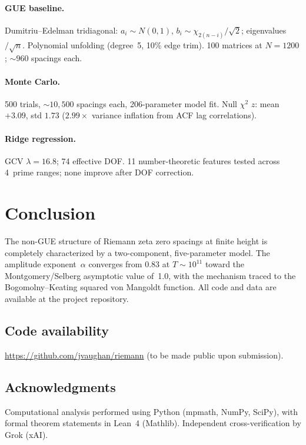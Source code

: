 \documentclass[11pt,a4paper]{article}
\begin{document}
\paragraph{GUE baseline.} Dumitriu--Edelman tridiagonal: $a_i \sim N(0,1)$, $b_i \sim \chi_{2(n-i)}/\!\sqrt{2}$; eigenvalues$/\!\sqrt{n}$.
Polynomial unfolding (degree~5, 10\% edge trim).
100 matrices at $N = 1200$; ${\sim}960$ spacings each.

\paragraph{Monte Carlo.} 500 trials, ${\sim}10{,}500$ spacings each, 206-parameter model fit. Null $\chi^2$ $z$: mean $+3.09$, std $1.73$ ($2.99\times$ variance inflation from ACF lag correlations).

\paragraph{Ridge regression.} GCV $\lambda = 16.8$; 74 effective DOF. 11 number-theoretic features tested across 4~prime ranges; none improve after DOF correction.

\section{Conclusion}

The non-GUE structure of Riemann zeta zero spacings at finite height is completely characterized by a two-component, five-parameter model.
The amplitude exponent~$\alpha$ converges from $0.83$ at $T \sim 10^{11}$ toward the Montgomery/Selberg asymptotic value of~1.0, with the mechanism traced to the Bogomolny--Keating squared von Mangoldt function.
All code and data are available at the project repository.

\subsection*{Code availability}
\url{https://github.com/jvaughan/riemann} (to be made public upon submission).

\subsection*{Acknowledgments}
Computational analysis performed using Python (mpmath, NumPy, SciPy), with formal theorem statements in Lean~4 (Mathlib).
Independent cross-verification by Grok (xAI).
\end{document}
